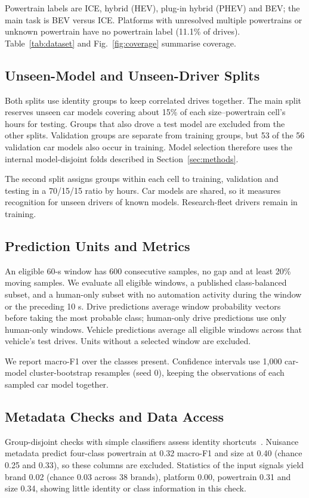 Powertrain labels are ICE, hybrid (HEV), plug-in hybrid (PHEV) and BEV; the main task is BEV versus ICE. Platforms with unresolved multiple powertrains or unknown powertrain have no powertrain label (11.1\% of drives). Table~\ref{tab:dataset} and Fig.~\ref{fig:coverage} summarise coverage.



\subsection{Unseen-Model and Unseen-Driver Splits}
Both splits use identity groups to keep correlated drives together. The main split reserves unseen car models covering about 15\% of each size--powertrain cell's hours for testing. Groups that also drove a test model are excluded from the other splits. Validation groups are separate from training groups, but 53 of the 56 validation car models also occur in training. Model selection therefore uses the internal model-disjoint folds described in Section~\ref{sec:methods}.

The second split assigns groups within each cell to training, validation and testing in a 70/15/15 ratio by hours. Car models are shared, so it measures recognition for unseen drivers of known models. Research-fleet drivers remain in training.

\subsection{Prediction Units and Metrics}
An eligible 60-s window has 600 consecutive samples, no gap and at least 20\% moving samples. We evaluate all eligible windows, a published class-balanced subset, and a human-only subset with no automation activity during the window or the preceding 10 s. Drive predictions average window probability vectors before taking the most probable class; human-only drive predictions use only human-only windows. Vehicle predictions average all eligible windows across that vehicle's test drives. Units without a selected window are excluded.

We report macro-F1 over the classes present. Confidence intervals use 1,000 car-model cluster-bootstrap resamples (seed 0), keeping the observations of each sampled car model together.

\subsection{Metadata Checks and Data Access}
Group-disjoint checks with simple classifiers assess identity shortcuts~\cite{geirhos2020shortcut}. Nuisance metadata predict four-class powertrain at 0.32 macro-F1 and size at 0.40 (chance 0.25 and 0.33), so these columns are excluded. Statistics of the input signals yield brand 0.02 (chance 0.03 across 38 brands), platform 0.00, powertrain 0.31 and size 0.34, showing little identity or class information in this check.

